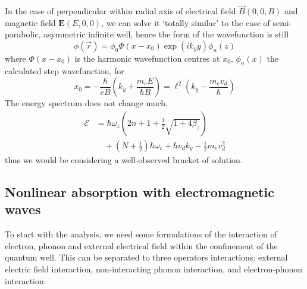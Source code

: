 \documentclass[%
 reprint,
 amsmath,amssymb,
 aps,
]{revtex4-2}
\begin{document}
In the case of perpendicular within radial axis of electrical field $\vec{B}(0,0,B)$ and magnetic field $\mathbf{E}(E,0,0)$, we can solve it `totally similar' to the case of semi-parabolic, asymmetric infinite well, hence the form of the wavefunction is still
\begin{equation} 
    \phi(\vec{r}) = \phi_{0}\Phi(x-x_0)\exp{(ik_{y}y)}\phi_{n}(z)
\end{equation}
where $\Phi(x-x_0)$ is the harmonic wavefunction centres at $x_{0}$, $\phi_{n}(x)$ the calculated step wavefunction, for \begin{equation}
    x_{0} = -\frac{\hbar}{eB} \left( k_{y} + \frac{m_{e}E}{\hbar B} \right) = \ell^{2} \left(k_y - \frac{m_e v_{d}}{\hbar}\right)
\end{equation}
The energy spectrum does not change much, 
\begin{equation}
    \begin{split}
        \mathcal{E} &= \hbar \omega_{z} \left( 2n+1 + \frac{1}{2}\sqrt{1+4\beta_{z}} \right) \\
        & \quad + \left(N+\frac{1}{2}\right)\hbar \omega_{c} + \hbar v_{d} k_{y} - \frac{1}{2} m_{e}v_{d}^{2}
    \end{split}
\end{equation}
thus we would be considering a well-observed bracket of solution. 
\subsection{Nonlinear absorption with electromagnetic waves}

To start with the analysis, we need some formulations of the interaction of electron, phonon and external electrical field within the confinement of the quantum well. This can be separated to three operators interactions: external electric field interaction, non-interacting phonon interaction, and electron-phonon interaction. 
\end{document}
